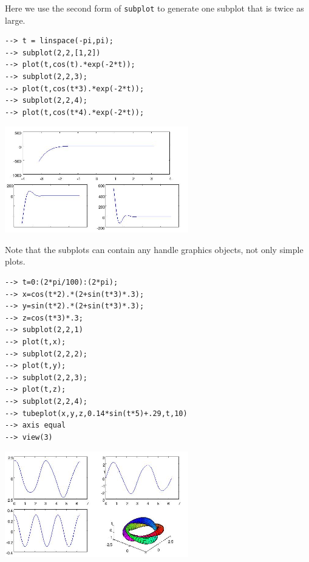 Here we use the second form of \verb|subplot| to generate one subplot
that is twice as large.
\begin{verbatim}
--> t = linspace(-pi,pi);
--> subplot(2,2,[1,2])
--> plot(t,cos(t).*exp(-2*t));
--> subplot(2,2,3);
--> plot(t,cos(t*3).*exp(-2*t));
--> subplot(2,2,4);
--> plot(t,cos(t*4).*exp(-2*t));
\end{verbatim}


\centerline{\includegraphics[width=8cm]{subplot2}}

Note that the subplots can contain any handle graphics objects,
not only simple plots.
\begin{verbatim}
--> t=0:(2*pi/100):(2*pi);
--> x=cos(t*2).*(2+sin(t*3)*.3);
--> y=sin(t*2).*(2+sin(t*3)*.3);
--> z=cos(t*3)*.3;
--> subplot(2,2,1)
--> plot(t,x);
--> subplot(2,2,2);
--> plot(t,y);
--> subplot(2,2,3);
--> plot(t,z);
--> subplot(2,2,4);
--> tubeplot(x,y,z,0.14*sin(t*5)+.29,t,10)
--> axis equal
--> view(3)
\end{verbatim}


\centerline{\includegraphics[width=8cm]{subplot3}}


